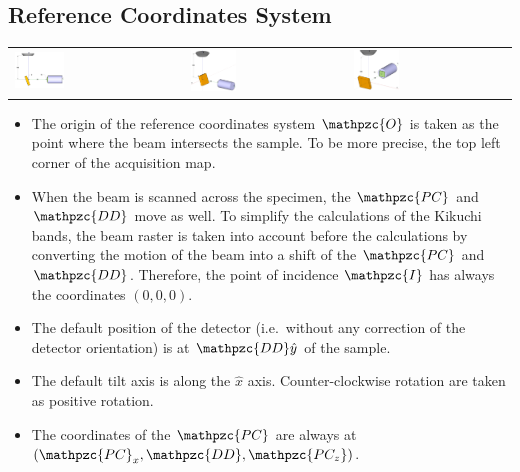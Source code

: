 \documentclass[letterpaper]{article}
\newcommand{\vx}{\hat{x}}
\newcommand{\vy}{\hat{y}}
\newcommand{\var}[1]{\mathpzc{#1}}
\begin{document}
	\subsection{Reference Coordinates System}
		\begin{tabular}{p{}p{}p{}}
			\includegraphics[width=0.3\textwidth]{figures/axis_system1} & \includegraphics[width=0.3\textwidth]{figures/axis_system2} & \includegraphics[width=0.3\textwidth]{figures/axis_system3} 
		\end{tabular}
		\begin{itemize}
			\item The origin of the reference coordinates system $\var{O}$ is taken as the point where the beam intersects the sample. To be more precise, the top left corner of the acquisition map.
			\item When the beam is scanned across the specimen, the $\var{PC}$ and $\var{DD}$ move as well. To simplify the calculations of the Kikuchi bands, the beam raster is taken into account before the calculations by converting the motion of the beam into a shift of the $\var{PC}$ and $\var{DD}$. Therefore, the point of incidence $\var{I}$ has always the coordinates $(0,0,0)$.
			\item The default position of the detector (i.e.\ without any correction of the detector orientation) is at $\var{DD}\vy$ of the sample.
			\item The default tilt axis is along the $\vx$ axis. Counter-clockwise rotation are taken as positive rotation.
			\item The coordinates of the $\var{PC}$ are always at $(\var{PC}_x, \var{DD}, \var{PC_z})$.
		\end{itemize}
	
\end{document}

